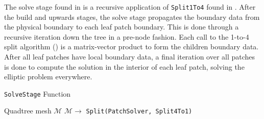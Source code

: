 The solve stage found in  is a recursive application of {\texttt{Split1To4}} found in . After the build and upwards stages, the solve stage propagates the boundary data from the physical boundary to each leaf patch boundary. This is done through a recursive iteration down the tree in a pre-node fashion. Each call to the 1-to-4 split algorithm () is a matrix-vector product to form the children boundary data. After all leaf patches have local boundary data, a final iteration over all patches is done to compute the solution in the interior of each leaf patch, solving the elliptic problem everywhere.

\begin{algorithm}[ht]
    \caption{\texttt{SolveStage} Function}
    \begin{algorithmic}[0]
        \Require Quadtree mesh $\mathcal{M}$
        \State $\mathcal{M} \rightarrow$ \texttt{Split(PatchSolver, Split4To1)} 
    \end{algorithmic}
    \label{alg:solve_stage}
\end{algorithm}